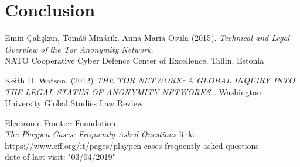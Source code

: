\documentclass[runningheads,a4paper]{llncs}
\begin{document}
\section{Conclusion}
\blindtext[3]



\begin{thebibliography}{9}

Emin \c{C}alı\c{s}kan, Tom\'{a}\u{s} Min\'{a}rik, Anna-Maria Osula (2015).
\textit{Technical and Legal Overview of the 
Tor Anonymity Network}.\\
NATO Cooperative Cyber Defence Center of 
Excellence, Tallin, Estonia

    Keith D. Watson. (2012)
    \textit{ THE TOR NETWORK: A GLOBAL INQUIRY INTO THE LEGAL STATUS OF ANONYMITY NETWORKS . }
    Washington University Global Studies Law Review

    Electronic Frontier Foundation\\
    \textit{The Playpen Cases: Frequently Asked Questions}
    link: https://www.eff.org/it/pages/playpen-cases-frequently-asked-questions\\
    date of last visit: "03/04/2019"

\end{thebibliography}
\end{document}
